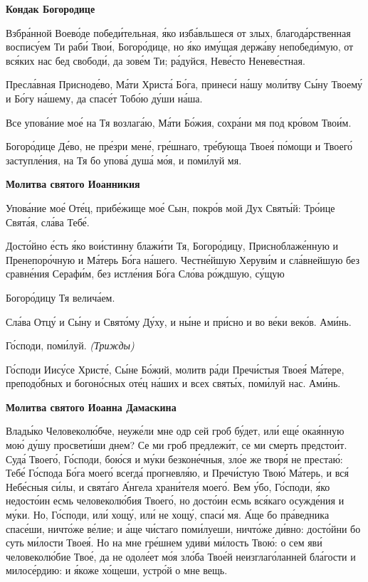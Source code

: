  

\bfseries Кондак Богородице\normalfont{}


   Взбра́нной Воево́де победи́тельная, я́ко изба́вльшеся от злых,
благода́рственная воспису́ем Ти раби́ Твои́, Богоро́дице, но я́ко иму́щая
держа́ву непобеди́мую, от вся́ких нас бед свободи́, да зове́м Ти; ра́дуйся,
Неве́сто Неневе́стная.


   Пресла́вная Присноде́во, Ма́ти Христа́ Бо́га, принеси́ на́шу моли́тву Сы́ну
Твоему́ и Бо́гу на́шему, да спасе́т Тобо́ю ду́ши на́ша.


   Все упова́ние мое́ на Тя возлага́ю, Ма́ти Бо́жия, сохра́ни мя под кро́вом
Твои́м.


   Богоро́дице Де́во, не пре́зри мене́, гре́шнаго, тре́бующа Твоея́
по́мощи и Твоего́ заступле́ния, на Тя бо упова́ душа́ мо́я, и поми́луй
мя.



 

\bfseries Молитва святого Иоанникия\normalfont{}


   Упова́ние мое́ Оте́ц, прибе́жище мое́ Сын, покро́в мой Дух Святы́й:
Тро́ице Свята́я, сла́ва Тебе́.


   Досто́йно е́сть я́ко вои́стинну блажи́ти Тя, Богоро́дицу, Присноблаже́нную и
Пренепоро́чную и Ма́терь Бо́га на́шего. Честне́йшую Херуви́м и сла́внейшую
без сравне́ния Серафи́м, без истле́ния Бо́га Сло́ва ро́ждшую, су́щую

Богоро́дицу Тя велича́ем.


   Сла́ва Отцу́ и Сы́ну и Свято́му Ду́ху, и ны́не и при́сно и во ве́ки веко́в.
Ами́нь.


   Го́споди, поми́луй. \itshape (Трижды)\normalfont{}


   Го́споди Иису́се Христе́, Сы́не Бо́жий, молитв ра́ди Пречи́стыя Твоея́
Ма́тере, преподо́бных и богоно́сных оте́ц на́ших и всех святы́х, поми́луй нас.
Ами́нь.



 

\bfseries Молитва святого Иоанна Дамаскина\normalfont{}


   Влады́ко Человеколю́бче, неуже́ли мне одр сей гроб бу́дет, или́ еще́
окая́нную мою́ ду́шу просвети́ши днем? Се ми гроб предлежи́т, се ми смерть
предстои́т. Суда́ Твоего́, Го́споди, бою́ся и му́ки безконе́чныя, зло́е же творя́
не престаю́: Тебе́ Го́спода Бо́га моего́ всегда́ прогневля́ю, и Пречи́стую Твою́
Ма́терь, и вся́ Небе́сныя си́лы, и свята́го А́нгела храни́теля моего́. Вем у́бо,
Го́споди, я́ко недосто́ин есмь человеколю́бия Твоего́, но досто́ин есмь вся́каго
осужде́ния и му́ки. Но, Го́споди, или́ хощу́, или́ не хощу́, спаси́ мя. А́ще бо
пра́ведника спасе́ши, ничто́же ве́лие; и а́ще чи́стаго поми́луеши, ничто́же
ди́вно: досто́йни бо суть ми́лости Твоея́. Но на мне гре́шнем удиви́ ми́лость
Твою́: о сем яви́ человеколю́бие Твое́, да не одоле́ет мо́я зло́ба Твое́й
неизглаго́ланней бла́гости и милосе́рдию: и я́коже хо́щеши, устро́й о мне
вещь.


